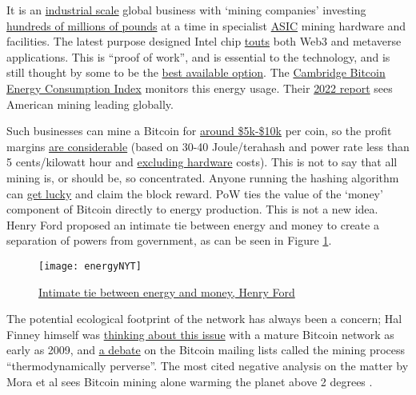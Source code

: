 It is an \href{https://www.ruetir.com/2022/03/18/riot-whinstone-the-bitcoin-farm-with-100000-computers-that-uses-excess-energy-from-an-oil-platform-to-mine-cryptocurrencies-ruetir/}{industrial scale} global business with `mining companies' investing \href{https://ir.marathondh.com/news-events/press-releases/detail/1272/marathon-digital-holdings-bitcoin-mining-fleet-to-reach}{hundreds of millions of pounds} at a time in specialist \href{https://en.wikipedia.org/wiki/Application-specific_integrated_circuit}{ASIC} mining hardware and facilities. The latest purpose designed Intel chip \href{https://www.intel.com/content/www/us/en/newsroom/opinion/thoughts-blockchain-custom-compute-group.html#gs.pd9ofu}{touts} both Web3 and metaverse applications. This is ``proof of work'',  and is essential to the technology, and is still thought by some to be the \href{https://www.truthcoin.info/blog/pow-cheapest/}{best available option}. The \href{https://ccaf.io/cbeci/index}{Cambridge Bitcoin Energy Consumption Index} monitors this energy usage. Their \href{https://www.jbs.cam.ac.uk/insight/2022/bitcoin-mining-new-data-reveal-a-surprising-resurgence/}{2022 report} sees American mining leading globally.\par
Such businesses can mine a Bitcoin for \href{https://www.911metallurgist.com/blog/the-cost-to-mine-different-cryptocurrencies-in-every-country}{around \$5k-\$10k} per coin, so the profit margins \href{https://www.nicehash.com/profitability-calculator}{are considerable} (based on 30-40 Joule/terahash and power rate less than 5 cents/kilowatt hour and \href{https://www.tradingview.com/script/WqgcFq9o-Blockchain-Fundamentals-Electricity-Cost-of-BTC-CR/?}{excluding hardware} costs). This is not to say that all mining is, or should be, so concentrated. Anyone running the hashing algorithm can \href{https://twitter.com/ckpooldev/status/1485585814419812356}{get lucky} and claim the block reward. PoW ties the value of the `money' component of Bitcoin directly to energy production. This is not a new idea. Henry Ford proposed an intimate tie between energy and money to create a separation of powers from government, as can be seen in Figure \ref{fig:energyNYT}.\
\begin{figure}
  \centering
    \texttt{[image: energyNYT]}
  \caption{\href{https://www.nytimes.com/1921/12/06/archives/mr-fords-energy-dollar.html}{Intimate tie between energy and money, Henry Ford}}
  \label{fig:energyNYT}
\end{figure}
The potential ecological footprint of the network has always been a concern; Hal Finney himself was \href{https://twitter.com/halfin/status/1153096538}{thinking about this issue} with a mature Bitcoin network as early as 2009, and \href{https://satoshi.nakamotoinstitute.org/posts/bitcointalk/threads/167/#35}{a debate} on the Bitcoin mailing lists called the mining process ``thermodynamically perverse''. The most cited negative analysis on the matter by Mora et al sees Bitcoin mining alone warming the planet above 2 degrees \cite{mora2018bitcoin}. \par
